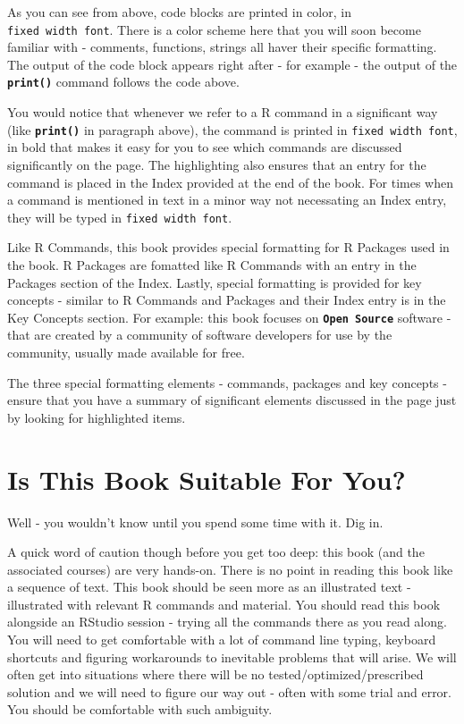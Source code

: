 \documentclass[]{krantz}
\theoremstyle{definition}
\theoremstyle{definition}
\theoremstyle{definition}
\theoremstyle{remark}
\begin{document}
As you can see from above, code blocks are printed in color, in
\texttt{fixed\ width\ font}. There is a color scheme here that you will
soon become familiar with - comments, functions, strings all haver their
specific formatting. The output of the code block appears right after -
for example - the output of the \textbf{\texttt{print()}} command
follows the code above.

You would notice that whenever we refer to a R command in a significant
way (like \textbf{\texttt{print()}} in paragraph above), the command is
printed in \texttt{fixed\ width\ font}, in bold that makes it easy for
you to see which commands are discussed significantly on the page. The
highlighting also ensures that an entry for the command is placed in the
Index provided at the end of the book. For times when a command is
mentioned in text in a minor way not necessating an Index entry, they
will be typed in \texttt{fixed\ width\ font}.

Like R Commands, this book provides special formatting for R Packages
used in the book. R Packages are fomatted like R Commands with an entry
in the Packages section of the Index. Lastly, special formatting is
provided for key concepts - similar to R Commands and Packages and their
Index entry is in the Key Concepts section. For example: this book
focuses on \textbf{\texttt{Open\ Source}} software - that are created by
a community of software developers for use by the community, usually
made available for free.

The three special formatting elements - commands, packages and key
concepts - ensure that you have a summary of significant elements
discussed in the page just by looking for highlighted items.

\section*{Is This Book Suitable For
You?}\label{is-this-book-suitable-for-you}


Well - you wouldn't know until you spend some time with it. Dig in.

A quick word of caution though before you get too deep: this book (and
the associated courses) are very hands-on. There is no point in reading
this book like a sequence of text. This book should be seen more as an
illustrated text - illustrated with relevant R commands and material.
You should read this book alongside an RStudio session - trying all the
commands there as you read along. You will need to get comfortable with
a lot of command line typing, keyboard shortcuts and figuring
workarounds to inevitable problems that will arise. We will often get
into situations where there will be no tested/optimized/prescribed
solution and we will need to figure our way out - often with some trial
and error. You should be comfortable with such ambiguity.
\end{document}
